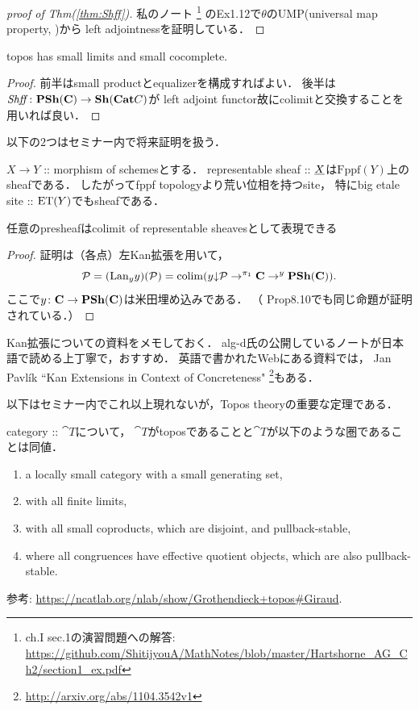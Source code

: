 \documentclass[a4paper]{jsarticle}
\begin{document}
\begin{proof}[proof of Thm(\ref{thm:Shff})]
    私のノート
    \footnote{\cite{HarAG} ch.I sec.1の演習問題への解答: 
        \url{https://github.com/ShitijyouA/MathNotes/blob/master/Hartshorne_AG_Ch2/section1_ex.pdf}}
    のEx1.12で$\theta$のUMP(universal map property, \cite{Awodey})から
    left adjointnessを証明している．
\end{proof}

\begin{Prop}
    topos has small limits and small cocomplete.
\end{Prop}
\begin{proof}
    前半はsmall productとequalizerを構成すればよい．
    後半は$\mathit{Shff} \colon \mathbf{PSh}(\mathbf{C}) \to \mathbf{Sh}(\mathbf{Cat}{C})$が
    left adjoint functor故にcolimitと交換することを用いれば良い．
\end{proof}

以下の$2$つはセミナー内で将来証明を扱う．
\begin{Thm}
    $X \to Y$ :: morphism of schemesとする．
    representable sheaf :: $\underline{X}$は$\mathrm{Fppf}(Y)$上のsheafである．
    したがってfppf topologyより荒い位相を持つsite，
    特にbig etale site :: $\mathrm{ET}(Y)$でもsheafである．
\end{Thm}

\begin{Prop}
    任意のpresheafはcolimit of representable sheavesとして表現できる
\end{Prop}
\begin{proof}
    証明は（各点）左Kan拡張を用いて，
    \[ \mathcal{P}=(\mathrm{Lan}_{y}y)(\mathcal{P})=\operatorname{colim}(y{\downarrow}\mathcal{P} \to^{\pi_1} \mathbf{C} \to^{y} \mathbf{PSh}(\mathbf{C})). \]
    ここで$y \colon \mathbf{C} \to \mathbf{PSh}(\mathbf{C})$は米田埋め込みである．
    （\cite{Awodey} Prop8.10でも同じ命題が証明されている．）
\end{proof}

\begin{Remark}
    Kan拡張についての資料をメモしておく．
    alg-d氏の公開しているノートが日本語で読める上丁寧で，おすすめ．
    英語で書かれたWebにある資料では，
    Jan Pavl\'ik ``Kan Extensions in Context of Concreteness"
    \footnote{ \url{http://arxiv.org/abs/1104.3542v1} }もある．
\end{Remark}

以下はセミナー内でこれ以上現れないが，Topos theoryの重要な定理である．
\begin{Thm}
    category :: $\cat{T}$について，
    $\cat{T}$がtoposであることと$\cat{T}$が以下のような圏であることは同値．
    \begin{enumerate}[label=(G\arabic*)]
        \item a locally small category with a small generating set,
        \item with all finite limits,
        \item with all small coproducts, which are disjoint, and pullback-stable,
        \item where all congruences have effective quotient objects, which are also pullback-stable.
    \end{enumerate}
    参考: \url{https://ncatlab.org/nlab/show/Grothendieck+topos#Giraud}.
\end{Thm}
\end{document}

